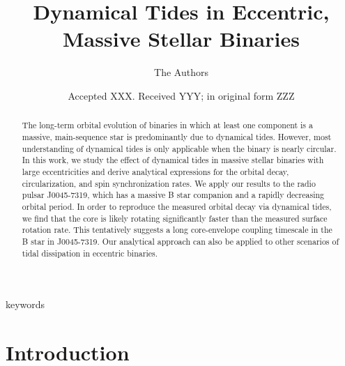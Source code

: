 \documentclass[
        fleqn,
        usenatbib,
    ]{mnras}
\title[Eccentric Dynamical Tides]{Dynamical Tides in Eccentric, Massive Stellar
Binaries}
\author[]{The Authors}
\date{Accepted XXX\@. Received YYY\@; in original form ZZZ}
\begin{document}
\label{firstpage}
\pagerange{\pageref{firstpage}--\pageref{lastpage}}
\maketitle

\begin{abstract}
    The long-term orbital evolution of binaries in which at least one component
    is a massive, main-sequence star is predominantly due to dynamical tides.
    However, most understanding of dynamical tides is only applicable when the
    binary is nearly circular. In this work, we study the effect of dynamical
    tides in massive stellar binaries with large eccentricities and derive
    analytical expressions for the orbital decay, circularization, and spin
    synchronization rates. We apply our results to the radio pulsar J0045-7319,
    which has a massive B star companion and a rapidly decreasing orbital
    period. In order to reproduce the measured orbital decay via dynamical
    tides, we find that the core is likely rotating significantly faster than
    the measured surface rotation rate. This tentatively suggests a long
    core-envelope coupling timescale in the B star in J0045-7319. Our analytical
    approach can also be applied to other scenarios of tidal dissipation in
    eccentric binaries.
\end{abstract}

\begin{keywords}
keywords
\end{keywords}

\section{Introduction}


\end{document}
